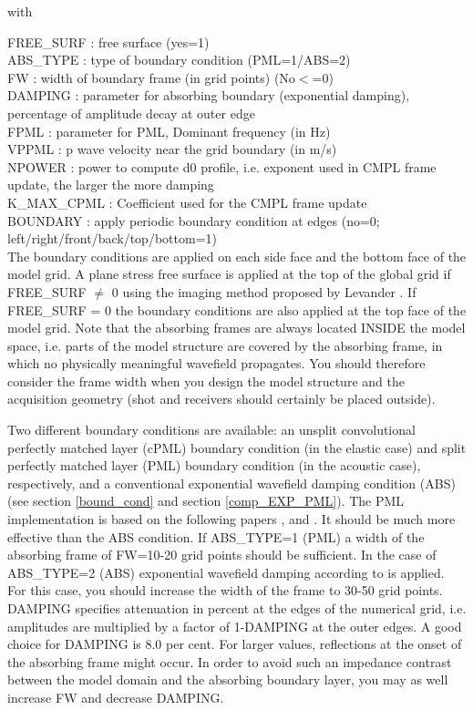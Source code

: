 \documentclass[11pt,onecolumn,oneside]{article}
\begin{document}
with

FREE\_SURF : free surface (yes=1)\\
ABS\_TYPE : type of boundary condition (PML=1/ABS=2)\\
FW : width of boundary frame (in grid points) (No$<$=0)\\
DAMPING : parameter for absorbing boundary (exponential damping), percentage of amplitude decay at outer edge\\
FPML : parameter for PML, Dominant frequency (in Hz)\\
VPPML : p wave velocity near the grid boundary (in m/s)\\
NPOWER :  power to compute d0 profile, i.e. exponent used in CMPL frame update, the larger the more damping \\
K\_MAX\_CPML :  Coefficient used for the CMPL frame update \\
BOUNDARY : apply periodic boundary condition at edges (no=0;
left/right/front/back/top/bottom=1) \\

The boundary conditions are applied on each side face and the bottom face of the model grid. A plane stress free surface is applied at the top of the global grid if FREE\_SURF $\neq$ 0 using the imaging method proposed by Levander \cite{levander:88}. If FREE\_SURF = 0 the boundary conditions are also applied at the top face of the model grid. Note that the absorbing frames are always located INSIDE the model space, i.e. parts of the model structure are covered by the absorbing frame, in which no physically meaningful wavefield propagates. You should therefore consider the frame width when you design the model structure and the acquisition geometry (shot and receivers should certainly be placed outside).

Two different boundary conditions are available: an unsplit convolutional perfectly matched layer (cPML) boundary condition (in the elastic case) and split perfectly matched layer (PML) boundary condition (in the acoustic case), respectively, and a conventional exponential wavefield damping condition (ABS) (see section \ref{bound_cond} and section \ref{comp_EXP_PML}). The PML implementation is based on the following papers \cite{collino:01}, \cite{komatitsch:07} and \cite{martin:09}. It should be much more effective than the ABS condition. If ABS\_TYPE=1 (PML) a width of the absorbing frame of FW=10-20 grid points should be sufficient. In the case of ABS\_TYPE=2 (ABS) exponential wavefield damping according to \cite{cerjan:85} is applied. For this case, you should increase the width of the frame to 30-50 grid points. DAMPING specifies attenuation in percent at the edges of the numerical grid, i.e. amplitudes are multiplied by a factor of 1-DAMPING at the outer edges. A good choice for DAMPING is 8.0 per cent. For larger values, reflections at the onset of the absorbing frame might occur. In order to avoid such an impedance contrast between the model domain and the absorbing boundary layer, you may as well increase FW and decrease DAMPING.
\end{document}
